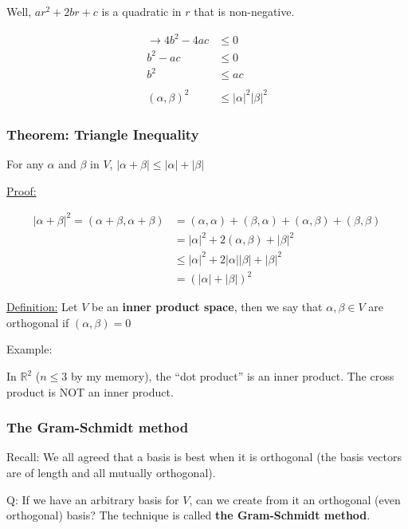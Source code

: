 Well, $ar^2 + 2br + c$ is a quadratic in $r$ that is non-negative.

\begin{align*}
  \rightarrow 4b^2 - 4ac & \leq 0 \\
              b^2 - ac   & \leq 0 \\
              b^2        & \leq ac \\
\\
       (\alpha, \beta)^2 &\leq |\alpha|^2 |\beta|^2
\end{align*}


\subsubsection{Theorem: Triangle Inequality}

For any $\alpha$ and $\beta$ in $V$, $|\alpha + \beta| \leq |\alpha| + |\beta|$

\underline{Proof:}

\begin{align*}
  |\alpha+\beta|^2 = (\alpha+\beta, \alpha+\beta) & = (\alpha, \alpha) + (\beta, \alpha) + (\alpha, \beta) + (\beta, \beta) \\
                                                  & = |\alpha|^2 + 2(\alpha, \beta) + |\beta|^2 \\
                                                  & \leq |\alpha|^2 + 2|\alpha||\beta| + |\beta|^2 \\
                                                  & = (|\alpha| + |\beta|)^2
\end{align*}


\underline{Definition:} Let $V$ be an \textbf{inner product space}, then we say that $\alpha, \beta \in V$ are orthogonal if $(\alpha, \beta) = 0$ 

Example:

In $\mathbb{R}^2$ ($n \leq 3$ by my memory), the ``dot product'' is an inner product. The cross product is NOT an inner product.


\subsubsection{The Gram-Schmidt method}

Recall: We all agreed that a basis is best when it is orthogonal (the basis vectors are of length and all mutually orthogonal).

Q: If we have an arbitrary basis for $V$, can we create from it an orthogonal (even orthogonal) basis? The technique is called \textbf{the Gram-Schmidt method}.

